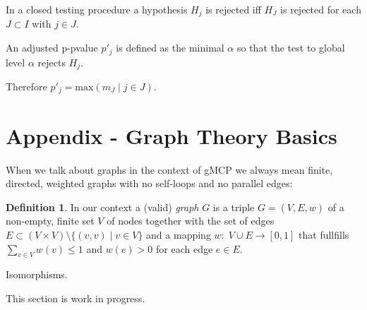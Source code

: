 \documentclass[a4paper, 10pt]{article}\usepackage[]{graphicx}\usepackage[]{color}
\numberwithin{equation}{section}
\theoremstyle{definition}
\newtheorem{Def}{Definition}[section]
\theoremstyle{plain}
\newtheorem{Theorem}[Def]{Theorem}
\newenvironment{Proof}{\par\noindent\upshape\textit{Proof. }\nopagebreak}{\qed\par}
\begin{document}
\begin{appendix}
In a closed testing procedure a hypothesis $H_j$ is rejected iff $H_J$
is rejected for each $J\subset I$ with $j\in J$.

An adjusted p-pvalue $p'_j$ is defined as the minimal $\alpha$ so that
the test to global level $\alpha$ rejects $H_j$.

Therefore $p'_j=\text{max}(m_J\;|\;j\in J)$.

\section{Appendix - Graph Theory Basics}

When we talk about graphs in the context of gMCP we always mean finite,
directed, weighted graphs with no self-loops and no parallel edges:

\begin{Def}
 In our context a (valid) \emph{graph} $G$ is a triple $G=(V,E,w)$
 of a non-empty, finite set $V$ of nodes together with the set of edges
 $E\subset (V\times V)\setminus\{(v,v)\;|\;v\in V\}$ and a mapping $w:\;V\cup
 E\rightarrow [0,1]$ that fullfills $\sum_{v\in V}w(v)\leq1$ and $w(e)>0$ for
 each edge $e\in E$.
\end{Def}

Isomorphisms.

This section is work in progress.


\end{appendix}

\newpage

\printindex

\newpage

\listofalgorithms
\listoffigures
\listoftables

\newpage



\end{document}
